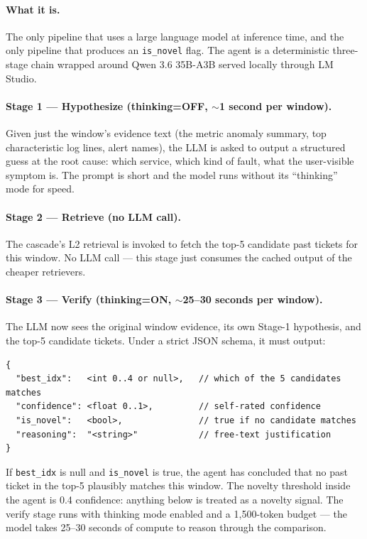 \paragraph{What it is.} The only pipeline that uses a large language model at inference time, and the only pipeline that produces an \texttt{is\_novel} flag. The agent is a deterministic three-stage chain wrapped around Qwen 3.6 35B-A3B served locally through LM Studio.

\paragraph{Stage 1 --- Hypothesize (thinking=OFF, $\sim$1 second per window).} Given just the window's evidence text (the metric anomaly summary, top characteristic log lines, alert names), the LLM is asked to output a structured guess at the root cause: which service, which kind of fault, what the user-visible symptom is. The prompt is short and the model runs without its ``thinking'' mode for speed.

\paragraph{Stage 2 --- Retrieve (no LLM call).} The cascade's L2 retrieval is invoked to fetch the top-5 candidate past tickets for this window. No LLM call --- this stage just consumes the cached output of the cheaper retrievers.

\paragraph{Stage 3 --- Verify (thinking=ON, $\sim$25--30 seconds per window).} The LLM now sees the original window evidence, its own Stage-1 hypothesis, and the top-5 candidate tickets. Under a strict JSON schema, it must output:

\begin{lstlisting}[basicstyle=\ttfamily\scriptsize]
{
  "best_idx":   <int 0..4 or null>,   // which of the 5 candidates matches
  "confidence": <float 0..1>,         // self-rated confidence
  "is_novel":   <bool>,               // true if no candidate matches
  "reasoning":  "<string>"            // free-text justification
}
\end{lstlisting}

If \texttt{best\_idx} is null and \texttt{is\_novel} is true, the agent has concluded that no past ticket in the top-5 plausibly matches this window. The novelty threshold inside the agent is 0.4 confidence: anything below is treated as a novelty signal. The verify stage runs with thinking mode enabled and a 1{,}500-token budget --- the model takes 25--30 seconds of compute to reason through the comparison.

